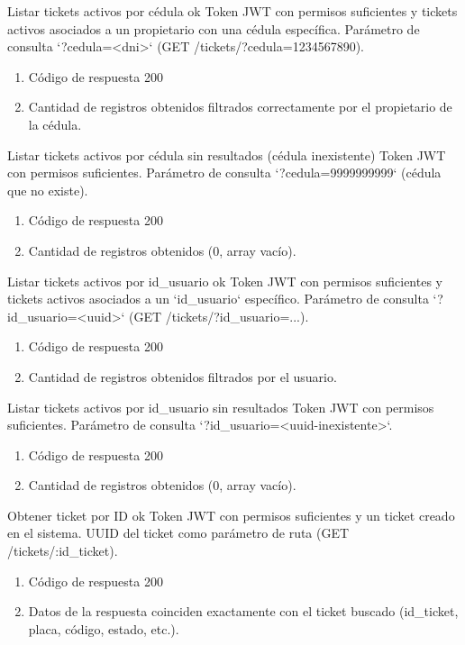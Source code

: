 {Listar tickets activos por cédula ok}
{Token JWT con permisos suficientes y tickets activos asociados a un propietario con una cédula específica.}
{Parámetro de consulta `?cedula=<dni>` (GET /tickets/?cedula=1234567890).}
{\begin{enumerate} [leftmargin=*, nosep]
    \item Código de respuesta 200
    \item Cantidad de registros obtenidos filtrados correctamente por el propietario de la cédula.
\end{enumerate}}

{Listar tickets activos por cédula sin resultados (cédula inexistente)}
{Token JWT con permisos suficientes.}
{Parámetro de consulta `?cedula=9999999999` (cédula que no existe).}
{\begin{enumerate} [leftmargin=*, nosep]
    \item Código de respuesta 200
    \item Cantidad de registros obtenidos (0, array vacío).
\end{enumerate}}

{Listar tickets activos por id\_usuario ok}
{Token JWT con permisos suficientes y tickets activos asociados a un `id\_usuario` específico.}
{Parámetro de consulta `?id\_usuario=<uuid>` (GET /tickets/?id\_usuario=...).}
{\begin{enumerate} [leftmargin=*, nosep]
    \item Código de respuesta 200
    \item Cantidad de registros obtenidos filtrados por el usuario.
\end{enumerate}}

{Listar tickets activos por id\_usuario sin resultados}
{Token JWT con permisos suficientes.}
{Parámetro de consulta `?id\_usuario=<uuid-inexistente>`.}
{\begin{enumerate} [leftmargin=*, nosep]
    \item Código de respuesta 200
    \item Cantidad de registros obtenidos (0, array vacío).
\end{enumerate}}

{Obtener ticket por ID ok}
{Token JWT con permisos suficientes y un ticket creado en el sistema.}
{UUID del ticket como parámetro de ruta (GET /tickets/:id\_ticket).}
{\begin{enumerate} [leftmargin=*, nosep]
    \item Código de respuesta 200
    \item Datos de la respuesta coinciden exactamente con el ticket buscado (id\_ticket, placa, código, estado, etc.).
\end{enumerate}}

